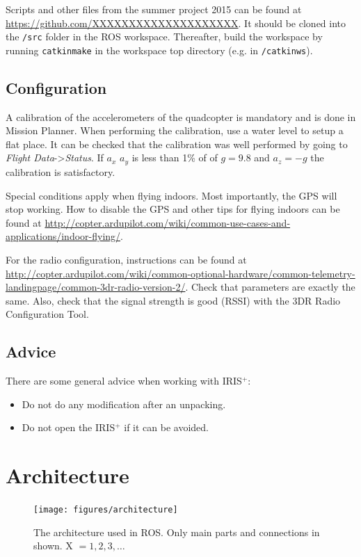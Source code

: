 \documentclass[titlepage,11pt,a4paper]{article}
\begin{document}
Scripts and other files from the summer project 2015 can be found at
\url{https://github.com/XXXXXXXXXXXXXXXXXXXX}. It should be cloned
into the \texttt{/src} folder in the ROS workspace. Thereafter, build
the workspace by running \texttt{catkin\textunderscore make} in the
workspace top directory (e.g. in \texttt{/catkin\textunderscore ws}).


\subsection{Configuration}
A calibration of the accelerometers of the quadcopter is
mandatory and is done in Mission Planner. When performing the
calibration, use a water level to setup
a flat place. It can be checked that the calibration was well
performed by going to \textit{Flight Data}->\textit{Status}. If $a_x$
$a_y$ is less than 1\% of of $g = 9.8$ and $a_z = -g$ the calibration
is satisfactory.

Special conditions apply when flying indoors. Most importantly, the
GPS will stop working. How to disable the GPS and other tips for
flying indoors can be found at \url{http://copter.ardupilot.com/wiki/common-use-cases-and-applications/indoor-flying/}.

For the radio configuration, instructions can be found at
\url{http://copter.ardupilot.com/wiki/common-optional-hardware/common-telemetry-landingpage/common-3dr-radio-version-2/}. Check
that parameters are exactly the same. Also, check that the signal
strength is good (RSSI) with the 3DR Radio Configuration Tool.

\subsection{Advice}
There are some general advice when working with IRIS$^+$:

\begin{itemize}
  \item Do not do any modification after an unpacking.
  \item Do not open the IRIS$^+$ if it can be avoided.
\end{itemize}



\section{Architecture}
\label{sec:architecture}

\begin{figure}[h!]                                                               
  \centering \texttt{[image: figures/architecture]}
  \caption{The architecture used in ROS. Only main parts and
    connections in shown. X $= 1, 2, 3, \dots$}
  \label{fig:architecture}                                                              
\end{figure}
\end{document}
